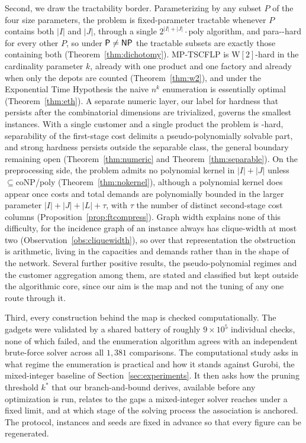 Second, we draw the tractability border. Parameterizing by any subset
$P$ of the four size parameters, the problem is fixed-parameter
tractable whenever $P$ contains both $|I|$ and $|J|$, through a single
$2^{|I|+|J|}\cdot\mathrm{poly}$ algorithm, and para-\NP-hard for every
other $P$, so under $\textsf{P}\neq\textsf{NP}$ the tractable subsets are exactly
those containing both (Theorem~\ref{thm:dichotomy}). MP-TSCFLP is
$\mathrm{W}[2]$-hard in the cardinality parameter $k$, already with one
product and one factory and already when only the depots are counted
(Theorem~\ref{thm:w2}), and under the Exponential Time Hypothesis the
naive $n^{k}$ enumeration is essentially optimal
(Theorem~\ref{thm:eth}). A separate numeric layer, our label for
hardness that persists after the combinatorial dimensions are
trivialized, governs the smallest instances. With a single customer and
a single product the problem is \NP-hard, separability of the
first-stage cost delimits a pseudo-polynomially solvable part, and
strong hardness persists outside the separable class, the general
boundary remaining open (Theorem~\ref{thm:numeric} and
Theorem~\ref{thm:separable}). On the preprocessing side, the problem
admits no polynomial kernel in $|I|+|J|$ unless
\NP${}\subseteq{}$coNP/poly (Theorem~\ref{thm:nokernel}), although a
polynomial kernel does appear once costs and total demands are
polynomially bounded in the larger parameter
$|I|+|J|+|L|+\tau$, with $\tau$ the number of distinct second-stage
cost columns (Proposition~\ref{prop:ftcompress}). Graph width explains none of this difficulty, for the incidence
graph of an instance always has clique-width at most two
(Observation~\ref{obs:cliquewidth}), so over that representation the
obstruction is arithmetic, living in the capacities and demands rather
than in the shape of the network. Several further positive
results, the pseudo-polynomial regimes and the
customer aggregation among them, are stated and classified but kept
outside the algorithmic core, since our aim is the map and not the
tuning of any one route through it.

Third, every construction behind the map is checked computationally.
The gadgets were validated by a shared battery of roughly
$9\times 10^{5}$ individual checks, none of which failed, and the enumeration algorithm agrees
with an independent brute-force solver across all $1{,}381$
comparisons. The computational study asks in what regime the
enumeration is practical and how it stands against Gurobi, the
mixed-integer baseline of Section~\ref{sec:experiments}. It then asks
how the pruning threshold $k^{\ast}$ that our branch-and-bound
derives, available before any optimization is run, relates to the
gaps a mixed-integer solver reaches under a fixed limit, and at which
stage of the solving process the association is anchored. The protocol, instances and seeds are fixed in advance so
that every figure can be regenerated.

